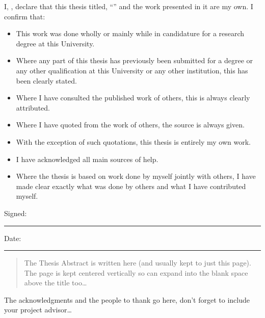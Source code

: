 \documentclass[
    11pt,
    oneside, %
    english,
    singlespacing, %
parskip, %
]{MastersDoctoralThesis}
\begin{document}
    \begin{declaration}
        \addchaptertocentry{\authorshipname} %
        \noindent I, \authorname, declare that this thesis titled, \enquote{\ttitle} and the work presented in it are my own.
        I confirm that:

        \begin{itemize}
            \item This work was done wholly or mainly while in candidature for a research degree at this University.
            \item Where any part of this thesis has previously been submitted for a degree or any other qualification at this University or any other institution, this has been clearly stated.
            \item Where I have consulted the published work of others, this is always clearly attributed.
            \item Where I have quoted from the work of others, the source is always given.
            \item With the exception of such quotations, this thesis is entirely my own work.
            \item I have acknowledged all main sources of help.
            \item Where the thesis is based on work done by myself jointly with others, I have made clear exactly what was done by others and what I have contributed myself.\\
        \end{itemize}

        \noindent Signed:\\
        \rule[0.5em]{25em}{0.5pt} %

        \noindent Date:\\
        \rule[0.5em]{25em}{0.5pt} %
    \end{declaration}


    \begin{abstract}
        \addchaptertocentry{\abstractname} %
        The Thesis Abstract is written here (and usually kept to just this page).
        The page is kept centered vertically so can expand into the blank space above the title too\ldots
    \end{abstract}


    \begin{acknowledgements}
        \addchaptertocentry{\acknowledgementname} %
        The acknowledgments and the people to thank go here, don't forget to include your project advisor\ldots
    \end{acknowledgements}
\end{document}

